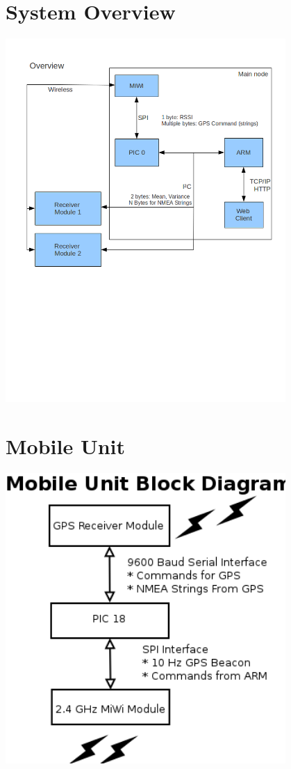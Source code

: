 \documentclass{article}
\begin{document}
\section*{System Overview}
\includegraphics[width=0.8\textwidth]{blockdiagram_overview}
\section*{Mobile Unit}
\includegraphics[width=0.8\textwidth]{mobileUnit}
\end{document}
